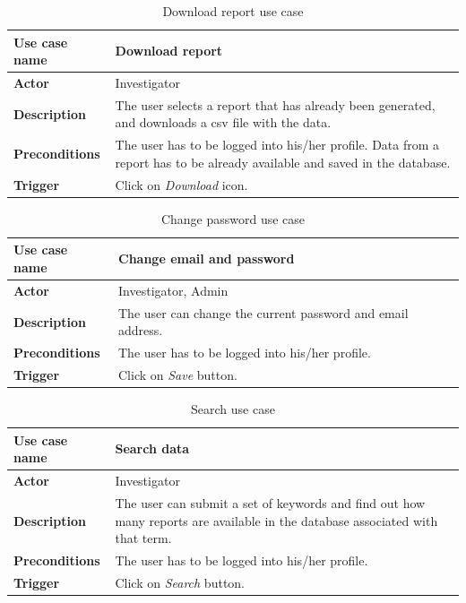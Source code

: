 \begin{table}[H]
\centering
\begin{tabular}{l p{9cm}}  
\toprule
\bf{Use case name}    & Download report \\
\midrule
\bf{Actor}    & Investigator \\
\midrule
\bf{Description}    & The user selects a report that has already been
generated, and downloads a csv file with the data.
\\
\midrule
\bf{Preconditions}    & The user has to be logged into his/her profile. Data
from a report has to be already available and saved in the database.
\\
\midrule
\bf{Trigger}    & Click on \emph{Download} icon. \\
\bottomrule
\end{tabular}
\caption{Download report use case}
\end{table}

\begin{table}[H]
\centering
\begin{tabular}{l p{9cm}}  
\toprule
\bf{Use case name}    & Change email and password \\
\midrule
\bf{Actor}    & Investigator, Admin \\
\midrule
\bf{Description}    & The user can change the current password and email
address.
\\
\midrule
\bf{Preconditions}    & The user has to be logged into his/her profile.
\\
\midrule
\bf{Trigger}    & Click on \emph{Save} button. \\
\bottomrule
\end{tabular}
\caption{Change password use case}
\end{table}

\begin{table}[H]
\centering
\begin{tabular}{l p{9cm}}  
\toprule
\bf{Use case name}    & Search data \\
\midrule
\bf{Actor}    & Investigator \\
\midrule
\bf{Description}    & The user can submit a set of keywords and find out how
many reports are available in the database associated with that term.
\\
\midrule
\bf{Preconditions}    & The user has to be logged into his/her profile.
\\
\midrule
\bf{Trigger}    & Click on \emph{Search} button. \\
\bottomrule
\end{tabular}
\caption{Search use case}
\end{table}

